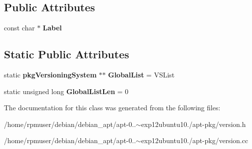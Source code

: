 \subsection*{\-Public \-Attributes}
\begin{DoxyCompactItemize}
\item 
const char $\ast$ {\bfseries \-Label}\label{classpkgVersioningSystem_a2c28600dbc88e9535c6e44b111829cc2}

\end{DoxyCompactItemize}
\subsection*{\-Static \-Public \-Attributes}
\begin{DoxyCompactItemize}
\item 
static {\bf pkg\-Versioning\-System} $\ast$$\ast$ {\bfseries \-Global\-List} = \-V\-S\-List\label{classpkgVersioningSystem_a10ad0ee37c2b6d25736b4c604b9f7fb5}

\item 
static unsigned long {\bfseries \-Global\-List\-Len} = 0\label{classpkgVersioningSystem_acdd1750df964c2a94afe622abfe15d7b}

\end{DoxyCompactItemize}


\-The documentation for this class was generated from the following files\-:\begin{DoxyCompactItemize}
\item 
/home/rpmuser/debian/debian\-\_\-apt/apt-\/0..$\sim$exp12ubuntu10./apt-\/pkg/version.\-h\item 
/home/rpmuser/debian/debian\-\_\-apt/apt-\/0..$\sim$exp12ubuntu10./apt-\/pkg/version.\-cc\end{DoxyCompactItemize}
